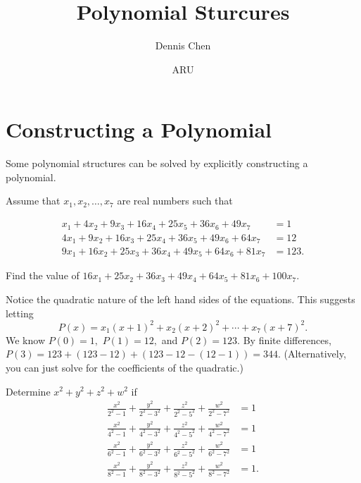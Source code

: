 \documentclass[mast]{lucky}
\title{Polynomial Sturcures}
\author{Dennis Chen}
\date{ARU}
\begin{document}
\maketitle

\section{Constructing a Polynomial}

Some polynomial structures can be solved by explicitly constructing a polynomial.

\begin{exam}[AIME 1989/8]
Assume that $x_1,x_2,\ldots,x_7$ are real numbers such that

\begin{align*}
x_1+4x_2+9x_3+16x_4+25x_5+36x_6+49x_7&=1\\
4x_1+9x_2+16x_3+25x_4+36x_5+49x_6+64x_7&=12\\
9x_1+16x_2+25x_3+36x_4+49x_5+64x_6+81x_7&=123.
\end{align*}

Find the value of $16x_1+25x_2+36x_3+49x_4+64x_5+81x_6+100x_7$.
\end{exam}

\begin{sol}
Notice the quadratic nature of the left hand sides of the equations. This suggests letting
\[P(x)=x_1(x+1)^2+x_2(x+2)^2+\cdots+x_7(x+7)^2.\]
We know $P(0)=1,$ $P(1)=12,$ and $P(2)=123.$ By finite differences, $P(3)=123+(123-12)+(123-12-(12-1))=344.$ (Alternatively, you can just solve for the coefficients of the quadratic.)
\end{sol}

\begin{exam}[AIME 1984/15]
Determine $x^2+y^2+z^2+w^2$ if
\begin{align*}
\frac{x^2}{2^2-1}+\frac{y^2}{2^2-3^2}+\frac{z^2}{2^2-5^2}+\frac{w^2}{2^2-7^2}&=1 \\
\frac{x^2}{4^2-1}+\frac{y^2}{4^2-3^2}+\frac{z^2}{4^2-5^2}+\frac{w^2}{4^2-7^2}&=1 \\
\frac{x^2}{6^2-1}+\frac{y^2}{6^2-3^2}+\frac{z^2}{6^2-5^2}+\frac{w^2}{6^2-7^2}&=1 \\
\frac{x^2}{8^2-1}+\frac{y^2}{8^2-3^2}+\frac{z^2}{8^2-5^2}+\frac{w^2}{8^2-7^2}&=1.
\end{align*}
\end{exam}
\end{document}
